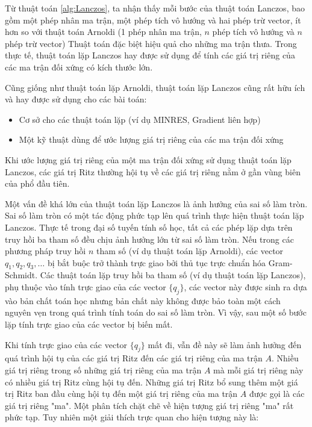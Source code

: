 \documentclass[14pt, a4paper]{article}
\numberwithin{equation}{section}
\numberwithin{algorithm}{section}
\numberwithin{figure}{section}
\numberwithin{dl}{section}
\numberwithin{md}{section}
\numberwithin{bd}{section}
\numberwithin{dn}{section}
\begin{document}
Từ thuật toán \ref{alg:Lanczos}, ta nhận thấy mỗi bước của thuật toán Lanczos, bao gồm một phép nhân ma trận, một phép tích vô hướng và hai phép trừ vector, ít hơn so với thuật toán Arnoldi (1 phép nhân ma trận, $n$ phép tích vô hướng và $n$ phép trừ vector)
Thuật toán đặc biệt hiệu quả cho những ma trận thưa. Trong thực tế, thuật toán lặp Lanczos hay được sử dụng để tính các giá trị riêng của các ma trận đối xứng có kích thước lớn.

Cũng giống như thuật toán lặp Arnoldi, thuật toán lặp Lanczos cũng rất hữu ích và hay được sử dụng cho các bài toán:

\begin{itemize}
    \item Cơ sở cho các thuật toán lặp (ví dụ MINRES, Gradient liên hợp)
    \item Một kỹ thuật dùng để ước lượng giá trị riêng của các ma trận đối xứng
\end{itemize}

Khi ước lượng giá trị riêng của một ma trận đối xứng sử dụng thuật toán lặp Lanczos, các giá trị Ritz thường hội tụ về các giá trị riêng nằm ở gần vùng biên của phổ đầu tiên. 

Một vấn đề khá lớn của thuật toán lặp Lanczos là ảnh hưởng của sai số làm tròn.
Sai số làm tròn có một tác động phức tạp lên quá trình thực hiện thuật toán lặp Lanczos. Thực tế trong đại số tuyến tính số học, tất cả các phép lặp dựa trên truy hồi ba tham số đều chịu ảnh hưởng lớn từ sai số làm tròn.
Nếu trong các phương pháp truy hồi $n$ tham số (ví dụ thuật toán lặp Arnoldi), các vector $q_1, q_2, q_3, \dots$ bị bắt buộc trở thành trực giao bởi thủ tục trực chuẩn hóa Gram-Schmidt. Các thuật toán lặp truy hồi ba tham số (ví dụ thuật toán lặp Lanczos), phụ thuộc vào tính trực giao của các vector $\lbrace q_j \rbrace$, các vector này được sinh ra dựa vào bản chất toán học nhưng bản chất này không được bảo toàn một cách nguyên vẹn trong quá trình tính toán do sai số làm tròn. Vì vậy, sau một số bước lặp tính trực giao của các vector bị biến mất.

Khi tính trực giao của các vector $\lbrace q_j \rbrace$ mất đi, vẫn đề này sẽ làm ảnh hưởng đến quá trình hội tụ của các giá trị Ritz đến các giá trị riêng của ma trận $A$. Nhiều giá trị riêng trong số những giá trị riêng của ma trận $A$ mà mỗi giá trị riêng này có nhiều giá trị Ritz cùng hội tụ đến. Những giá trị Ritz bổ sung thêm một giá trị Ritz ban đầu cùng hội tụ đến một giá trị riêng của ma trận $A$ được gọi là các giá trị riêng "ma".
Một phân tích chặt chẽ về hiện tượng giá trị riêng "ma" rất phức tạp. Tuy nhiên một giải thích trực quan cho hiện tượng này là:
\end{document}
